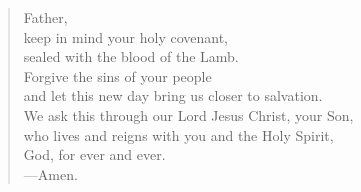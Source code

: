 \prayer

\setlength{\vleftmargin}{\prayerleftmargini}

\begin{verse}
Father,\\
keep in mind your holy covenant,\\
sealed with the blood of the Lamb.\\
Forgive the sins of your people\\
and let this new day bring us closer to salvation.\\
We ask this through our Lord Jesus Christ, your Son,\\
who lives and reigns with you and the Holy Spirit,\\
God, for ever and ever.\\
{\color{red}---\thinspace}Amen.
\end{verse}

\setlength{\vleftmargin}{\defleftmargini}